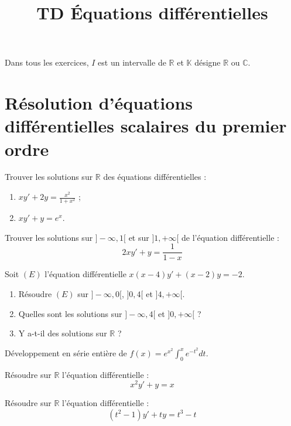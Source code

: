 \documentclass[french,a4paper]{article}
\title{TD Équations différentielles}
\newcommand{\R}{\mathbb{R}}
\newcommand{\C}{\mathbb{C}}
\newcommand{\K}{\mathbb{K}}
\theoremstyle{plain}
\theoremstyle{definition}
\theoremstyle{remark}
\begin{document}
\maketitle

Dans tous les exercices, $I$ est un intervalle de $\R$ et $\K$ désigne $\R$ ou $\C$.

\section{Résolution d'équations différentielles scalaires du premier ordre}

\begin{ex}[Moulin.01]{}
	Trouver les solutions sur $\R$ des équations différentielles :
	\begin{enumerate}
		\item $xy'+2y=\displaystyle\frac{x^2}{1+x^2}$ ;
		\item $xy'+y=e^x$.
	\end{enumerate}
\end{ex}

\begin{ex}[Moulin.02]{}
	Trouver les solutions sur $]-\infty,1[$ et sur $]1,+\infty[$ de l'équation différentielle : $$2xy'+y=\frac{1}{1-x}$$
\end{ex}

\begin{ex}[Moulin.03]{}
	Soit $(E)$ l'équation différentielle $x(x-4)y'+(x-2)y=-2$.
	\begin{enumerate}
		\item Résoudre $(E)$ sur $]-\infty,0[$, $]0,4[$ et $]4,+\infty[$.
		\item Quelles sont les solutions sur $]-\infty,4[$ et $]0,+\infty[$ ?
		\item Y a-t-il des solutions sur $\R$ ?
	\end{enumerate}
\end{ex}

\begin{ex}[Moulin.04]{}
	Développement en série entière de $f(x)=\displaystyle e^{x^2}\int_{0}^{x}e^{-t^2}dt$.
\end{ex}

\begin{ex}[Moulin.05]{}
	Résoudre sur $\R$ l'équation différentielle : $$x^2y'+y=x$$
\end{ex}

\begin{ex}[Moulin.06]{}
	Résoudre sur $\R$ l'équation différentielle : $$(t^2-1)y'+ty=t^3-t$$
\end{ex}
\end{document}
